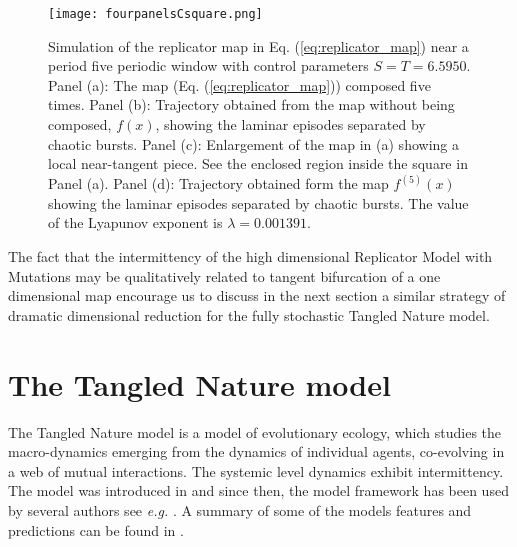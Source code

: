 \documentclass[12pt]{article}
\begin{document}
\begin{figure}[!h]
\centering
\texttt{[image: fourpanelsCsquare.png]}
\caption{Simulation of the replicator map in Eq. (\ref{eq:replicator_map}) near a period five periodic window with control parameters $S=T=6.5950$. Panel (a): The map (Eq. (\ref{eq:replicator_map})) composed five times. Panel (b): Trajectory obtained from the map without being composed, $f(x)$, showing the laminar episodes separated by chaotic bursts. Panel (c): Enlargement of the map in (a) showing a local near-tangent piece. See the enclosed region inside the square in Panel (a). Panel (d): Trajectory obtained form the map $f^{(5)}(x)$ showing the laminar episodes separated by chaotic bursts. The value of the Lyapunov exponent is $\lambda=0.001391$.}
\label{rep_map}
\end{figure}

The fact that the intermittency of the high dimensional Replicator Model with Mutations may be qualitatively related to tangent bifurcation of a one dimensional map encourage us to discuss in the next section a similar strategy of dramatic dimensional reduction for the fully stochastic Tangled Nature model.  

\section{The Tangled Nature model}
The Tangled Nature model is a model of evolutionary ecology, which studies the macro-dynamics emerging from the dynamics of individual agents, co-evolving in a web of mutual interactions. The systemic level dynamics exhibit intermittency. The model was introduced in \cite{tana:article1,tana:article2} and since then, the model framework has been used by several authors see \textit{e.g.} \cite{FakeTanaBasic,FakeTaNaFluctuations,Becker_Sibani_2014,Nicholson_Sibani_2015,Vazquez_2015}. A summary of some of the models features and predictions can be found in \cite{Sibani2013}.    
\end{document}
